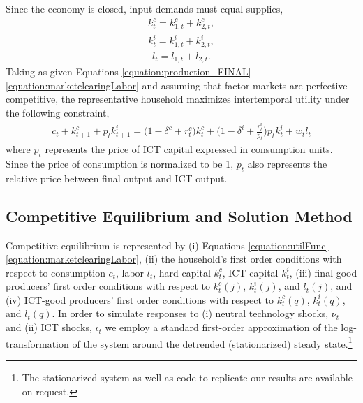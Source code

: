 \documentclass[12pt]{article}
\begin{document}
Since the economy is closed, input demands must equal supplies,
\begin{eqnarray}\label{equation:marketclearingHard}
k^c_t = k^c_{1,t} + k^c_{2,t},
\end{eqnarray}
\begin{eqnarray}\label{equation:marketclearingICT}
k^i_t = k^i_{1,t} + k^i_{2,t}, 
\end{eqnarray}
\begin{eqnarray}\label{equation:marketclearingLabor}
l_t = l_{1,t} + l_{2,t}.
\end{eqnarray}
Taking as given Equations \ref{equation:production_FINAL}-\ref{equation:marketclearingLabor} and assuming that factor markets are perfective competitive, the representative household maximizes intertemporal utility under the following constraint,
\begin{eqnarray}\label{equation:resourceHH}
	c_t + k^c_{t+1} +p_t k^i_{t+1} = \bigg( 1 - \delta^c + r^c_t \bigg) k^c_t + \bigg( 1 - \delta^i + \frac{r^i_t}{p_t} \bigg) p_t k^i_t + w_t l_t	
\end{eqnarray}
where $p_t$ represents the price of ICT capital expressed in consumption units. Since the price of consumption is normalized to be 1, $p_t$ also represents the relative price between final output and ICT output.

\subsection{Competitive Equilibrium and Solution Method}

Competitive equilibrium is represented by (i) Equations \ref{equation:utilFunc}-\ref{equation:marketclearingLabor}, (ii) the household's first order conditions with respect to consumption $c_t$, labor $l_t$, hard capital $k^c_t$, ICT capital $k^i_t$, (iii) final-good producers' first order conditions with respect to $k^c_{t}(j)$, $k^i_{t}(j)$, and $l_{t}(j)$, and (iv) ICT-good producers' first order conditions with respect to $k^c_{t}(q)$, $k^i_{t}(q)$, and $l_{t}(q)$. In order to simulate responses to (i) neutral technology shocks, $\nu_t$ and (ii) ICT shocks, $\iota_t$ we employ a standard first-order approximation of the log-transformation of the system around the detrended (stationarized) steady state.\footnote{The stationarized system as well as code to replicate our results are available on request.} 

\end{document}

